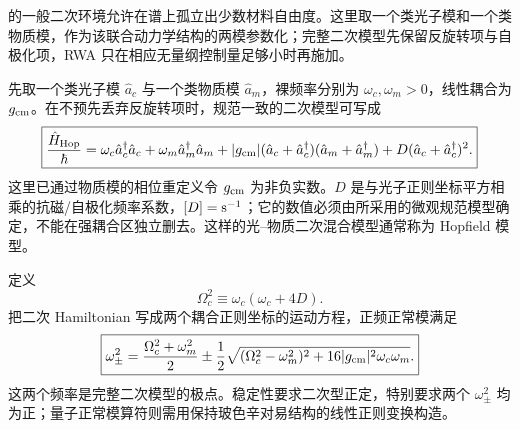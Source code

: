 \begin{exbox}
的一般二次环境允许在谱上孤立出少数材料自由度。这里取一个类光子模和一个类物质模，作为该联合动力学结构的两模参数化；完整二次模型先保留反旋转项与自极化项，RWA 只在相应无量纲控制量足够小时再施加。

先取一个类光子模 $\hat a_c$ 与一个类物质模 $\hat a_m$，裸频率分别为 $\omega_c,\omega_m>0$，线性耦合为 $g_{\rm cm}$。在不预先丢弃反旋转项时，规范一致的二次模型可写成
\begin{equation}
\boxed{
\frac{\hat H_{\rm Hop}}{\hbar}
=\omega_c \hat a_c^\dagger\hat a_c+\omega_m \hat a_m^\dagger\hat a_m
+|g_{\rm cm}|(\hat a_c+\hat a_c^\dagger)(\hat a_m+\hat a_m^\dagger)
+D(\hat a_c+\hat a_c^\dagger)^2 .}
\label{eq:hopfield-full-hamiltonian-dp68}
\end{equation}
这里已通过物质模的相位重定义令 $g_{\rm cm}$ 为非负实数。$D$ 是与光子正则坐标平方相乘的抗磁/自极化频率系数，$[D]={\rm s^{-1}}$；它的数值必须由所采用的微观规范模型确定，不能在强耦合区独立删去。这样的光--物质二次混合模型通常称为 Hopfield 模型。

定义
\begin{equation*}
\Omega_c^2\equiv\omega_c(\omega_c+4D).
\end{equation*}
把二次 Hamiltonian 写成两个耦合正则坐标的运动方程，正频正常模满足
\begin{equation}
\boxed{
\omega_\pm^2
=\frac{\Omega_c^2+\omega_m^2}{2}
\pm\frac12\sqrt{(\Omega_c^2-\omega_m^2)^2
+16|g_{\rm cm}|^2\omega_c\omega_m}.}
\label{eq:hopfield_full_quadratic_frequencies}
\end{equation}
这两个频率是完整二次模型的极点。稳定性要求二次型正定，特别要求两个 $\omega_\pm^2$ 均为正；量子正常模算符则需用保持玻色辛对易结构的线性正则变换构造。


\end{exbox}
